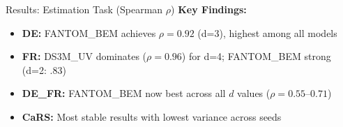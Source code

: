 \documentclass[aspectratio=169]{beamer}
\begin{document}
\begin{frame}{Results: Estimation Task (Spearman $\rho$)}
\vspace{0.2cm}
\textbf{Key Findings:}
\begin{itemize}
    \item \textbf{DE:} FANTOM\_BEM achieves $\rho = 0.92$ (d=3), highest among all models
    \item \textbf{FR:} DS3M\_UV dominates ($\rho = 0.96$) for d=4; FANTOM\_BEM strong (d=2: $.83$)
    \item \textbf{DE\_FR:} FANTOM\_BEM now best across all $d$ values ($\rho = 0.55$--$0.71$)
    \item \textbf{CaRS:} Most stable results with lowest variance across seeds
\end{itemize}
\end{frame}

\end{document}
